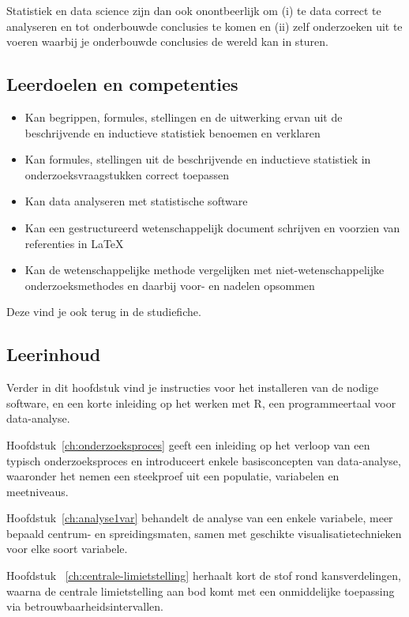 Statistiek  en data science zijn dan ook onontbeerlijk om (i) te data correct te analyseren en tot onderbouwde conclusies te komen en (ii) zelf onderzoeken uit te voeren waarbij je onderbouwde conclusies de wereld kan in sturen. 

\subsection{Leerdoelen en competenties}

\begin{itemize}
  \item Kan begrippen, formules, stellingen en de uitwerking ervan uit de beschrijvende en inductieve statistiek benoemen en verklaren
  \item Kan formules, stellingen uit de beschrijvende en inductieve statistiek in onderzoeksvraagstukken correct toepassen
  \item Kan data analyseren met statistische software
  \item Kan een gestructureerd wetenschappelijk document schrijven en voorzien van referenties in \LaTeX{}
  \item Kan de wetenschappelijke methode vergelijken met niet-wetenschappelijke onderzoeksmethodes en daarbij voor- en nadelen opsommen 
\end{itemize}

Deze vind je ook terug in de studiefiche.

\subsection{Leerinhoud}

Verder in dit hoofdstuk vind je instructies voor het installeren van de nodige software, en een korte inleiding op het werken met R, een programmeertaal voor data-analyse.

Hoofdstuk~\ref{ch:onderzoeksproces} geeft een inleiding op het verloop van een typisch onderzoeksproces en introduceert enkele basisconcepten van data-analyse, waaronder het nemen een steekproef uit een populatie, variabelen en meetniveaus.

Hoofdstuk~\ref{ch:analyse1var} behandelt de analyse van een enkele variabele, meer bepaald centrum- en spreidingsmaten, samen met geschikte visualisatietechnieken voor elke soort variabele.

Hoofdstuk ~\ref{ch:centrale-limietstelling} herhaalt kort de stof rond kansverdelingen, waarna de centrale limietstelling aan bod komt met een onmiddelijke toepassing via betrouwbaarheidsintervallen. 

